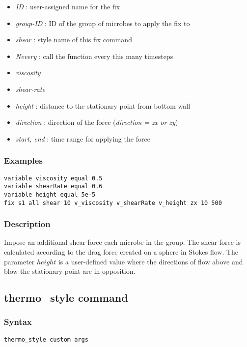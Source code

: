 \documentclass[11pt,a4paper,openright]{article}
\begin{document}
\begin{itemize}
\item
	{\it ID }: user-assigned name for the fix
\item
	{\it group-ID }: ID of the group of microbes to apply the fix to
\item
	{\it shear }: style name of this fix command
\item
	{\it Nevery }: call the function every this many timesteps
\item
	{\it viscosity }
\item
	{\it shear-rate }
\item
	{\it height }: distance to the stationary point from bottom wall
\item
	{\it direction }: direction of the force ({\it direction = zx or zy})
\item
	{\it start, end }: time range for applying the force

\end{itemize}

\subsubsection*{Examples}

\begin{Verbatim}[frame=single]
variable viscosity equal 0.5
variable shearRate equal 0.6
variable height equal 5e-5
fix s1 all shear 10 v_viscosity v_shearRate v_height zx 10 500
\end{Verbatim}

\subsubsection*{Description}
Impose an additional shear force each microbe in the group. The shear force is calculated according to the drag force created on a sphere in Stokes flow. The parameter $height$ is a user-defined value where the directions of flow above and blow the stationary point are in opposition.


\newpage
\subsection{thermo\_style command}

\subsubsection*{Syntax}
\begin{Verbatim}[frame=single]
	thermo_style custom args
\end{Verbatim}
\end{document}
